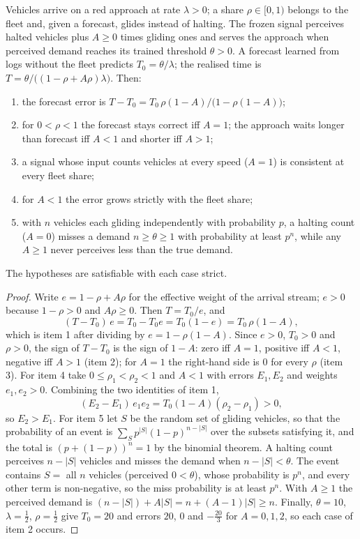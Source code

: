 \begin{theorem}\label{thm:queue}
Vehicles arrive on a red approach at rate $\lambda>0$; a share $\rho\in[0,1)$ belongs to the fleet and, given a forecast, glides instead of
halting. The frozen signal perceives halted vehicles plus $A\ge0$ times gliding ones and serves the approach when perceived demand reaches
its trained threshold $\theta>0$. A forecast learned from logs without the fleet predicts $T_0=\theta/\lambda$; the realised time is
$T=\theta/\big((1-\rho+A\rho)\lambda\big)$. Then:
\begin{enumerate}\setlength\itemsep{0pt}
\item the forecast error is $T-T_0=T_0\,\rho(1-A)/\big(1-\rho(1-A)\big)$;
\item for $0<\rho<1$ the forecast stays correct iff $A=1$; the approach waits longer than forecast iff $A<1$ and shorter iff $A>1$;
\item a signal whose input counts vehicles at every speed ($A=1$) is consistent at every fleet share;
\item for $A<1$ the error grows strictly with the fleet share;
\item with $n$ vehicles each gliding independently with probability $p$, a halting count ($A=0$) misses a demand $n\ge\theta\ge1$ with
probability at least $p^n$, while any $A\ge1$ never perceives less than the true demand.
\end{enumerate}
The hypotheses are satisfiable with each case strict.
\end{theorem}
\begin{proof}
Write $e=1-\rho+A\rho$ for the effective weight of the arrival stream; $e>0$ because $1-\rho>0$ and $A\rho\ge0$. Then $T=T_0/e$, and
\[(T-T_0)\,e=T_0-T_0e=T_0(1-e)=T_0\,\rho(1-A),\]
which is item 1 after dividing by $e=1-\rho(1-A)$. Since $e>0$, $T_0>0$ and $\rho>0$, the sign of $T-T_0$ is the sign of $1-A$: zero iff
$A=1$, positive iff $A<1$, negative iff $A>1$ (item 2); for $A=1$ the right-hand side is 0 for every $\rho$ (item 3). For item 4 take
$0\le\rho_1<\rho_2<1$ and $A<1$ with errors $E_1,E_2$ and weights $e_1,e_2>0$. Combining the two identities of item 1,
\[(E_2-E_1)\,e_1e_2=T_0(1-A)(\rho_2-\rho_1)>0,\]
so $E_2>E_1$. For item 5 let $S$ be the random set of gliding vehicles, so that the probability of an event is
$\sum_{S}p^{|S|}(1-p)^{n-|S|}$ over the subsets satisfying it, and the total is $(p+(1-p))^n=1$ by the binomial theorem. A halting count
perceives $n-|S|$ vehicles and misses the demand when $n-|S|<\theta$. The event contains $S=$ all $n$ vehicles (perceived $0<\theta$), whose
probability is $p^n$, and every other term is non-negative, so the miss probability is at least $p^n$. With $A\ge1$ the perceived demand is
$(n-|S|)+A|S|=n+(A-1)|S|\ge n$. Finally, $\theta=10$, $\lambda=\tfrac12$, $\rho=\tfrac12$ give $T_0=20$ and errors $20$, $0$ and $-\tfrac{20}{3}$
for $A=0,1,2$, so each case of item 2 occurs.
\end{proof}
